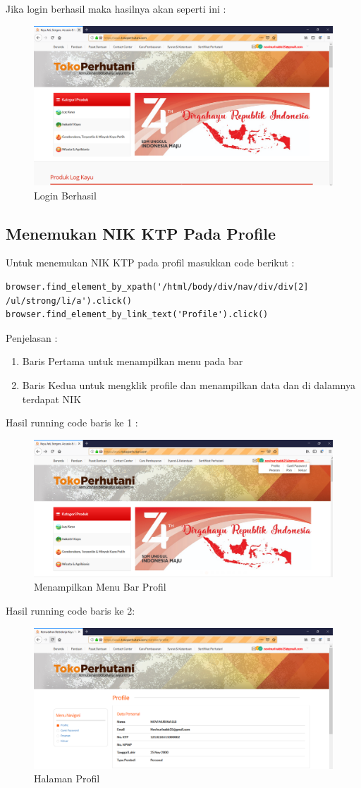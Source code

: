 Jika login berhasil maka hasilnya akan seperti ini :
\begin{figure}[h]
	\centering
	\includegraphics[scale=0.25]{figures/loginn}
	\caption{Login Berhasil}
\end{figure}

\newpage
\subsection{Menemukan NIK KTP Pada Profile}
Untuk menemukan NIK KTP pada profil masukkan code berikut :
\begin{verbatim}
browser.find_element_by_xpath('/html/body/div/nav/div/div[2]
/ul/strong/li/a').click()
browser.find_element_by_link_text('Profile').click()
\end{verbatim}

Penjelasan :
\begin{enumerate}
	\item Baris Pertama untuk menampilkan menu pada bar
	\item Baris Kedua untuk mengklik profile dan menampilkan data dan di dalamnya terdapat NIK
\end{enumerate}

Hasil running code baris ke 1 :
\begin{figure}[h]
	\centering
	\includegraphics[scale=0.25]{figures/caripropil}
	\caption{Menampilkan Menu Bar Profil}
\end{figure}

Hasil running code baris ke 2:
\begin{figure}[h]
	\centering
	\includegraphics[scale=0.25]{figures/cari}
	\caption{Halaman Profil}
\end{figure}